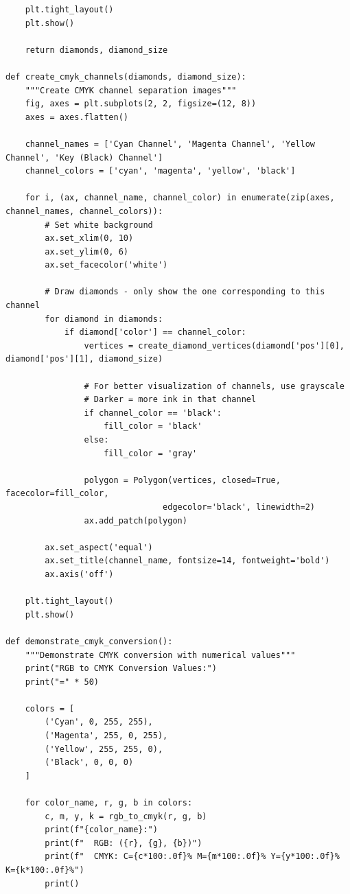 \documentclass{article}
\begin{document}
\begin{lstlisting}
    plt.tight_layout()
    plt.show()
    
    return diamonds, diamond_size

def create_cmyk_channels(diamonds, diamond_size):
    """Create CMYK channel separation images"""
    fig, axes = plt.subplots(2, 2, figsize=(12, 8))
    axes = axes.flatten()
    
    channel_names = ['Cyan Channel', 'Magenta Channel', 'Yellow Channel', 'Key (Black) Channel']
    channel_colors = ['cyan', 'magenta', 'yellow', 'black']
    
    for i, (ax, channel_name, channel_color) in enumerate(zip(axes, channel_names, channel_colors)):
        # Set white background
        ax.set_xlim(0, 10)
        ax.set_ylim(0, 6)
        ax.set_facecolor('white')
        
        # Draw diamonds - only show the one corresponding to this channel
        for diamond in diamonds:
            if diamond['color'] == channel_color:
                vertices = create_diamond_vertices(diamond['pos'][0], diamond['pos'][1], diamond_size)
                
                # For better visualization of channels, use grayscale
                # Darker = more ink in that channel
                if channel_color == 'black':
                    fill_color = 'black'
                else:
                    fill_color = 'gray'
                
                polygon = Polygon(vertices, closed=True, facecolor=fill_color, 
                                edgecolor='black', linewidth=2)
                ax.add_patch(polygon)
        
        ax.set_aspect('equal')
        ax.set_title(channel_name, fontsize=14, fontweight='bold')
        ax.axis('off')
    
    plt.tight_layout()
    plt.show()

def demonstrate_cmyk_conversion():
    """Demonstrate CMYK conversion with numerical values"""
    print("RGB to CMYK Conversion Values:")
    print("=" * 50)
    
    colors = [
        ('Cyan', 0, 255, 255),
        ('Magenta', 255, 0, 255),
        ('Yellow', 255, 255, 0),
        ('Black', 0, 0, 0)
    ]
    
    for color_name, r, g, b in colors:
        c, m, y, k = rgb_to_cmyk(r, g, b)
        print(f"{color_name}:")
        print(f"  RGB: ({r}, {g}, {b})")
        print(f"  CMYK: C={c*100:.0f}% M={m*100:.0f}% Y={y*100:.0f}% K={k*100:.0f}%")
        print()


\end{lstlisting}
\end{document}
